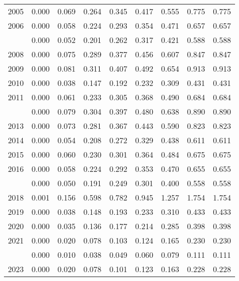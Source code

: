 \documentclass[
]{article}
\begin{document}
\begin{longtable}[t]{lrrrrrrrr}
2005 & 0.000 & 0.069 & 0.264 & 0.345 & 0.417 & 0.555 & 0.775 & 0.775\\
2006 & 0.000 & 0.058 & 0.224 & 0.293 & 0.354 & 0.471 & 0.657 & 0.657\\
\addlinespace
2007 & 0.000 & 0.052 & 0.201 & 0.262 & 0.317 & 0.421 & 0.588 & 0.588\\
2008 & 0.000 & 0.075 & 0.289 & 0.377 & 0.456 & 0.607 & 0.847 & 0.847\\
2009 & 0.000 & 0.081 & 0.311 & 0.407 & 0.492 & 0.654 & 0.913 & 0.913\\
2010 & 0.000 & 0.038 & 0.147 & 0.192 & 0.232 & 0.309 & 0.431 & 0.431\\
2011 & 0.000 & 0.061 & 0.233 & 0.305 & 0.368 & 0.490 & 0.684 & 0.684\\
\addlinespace
2012 & 0.000 & 0.079 & 0.304 & 0.397 & 0.480 & 0.638 & 0.890 & 0.890\\
2013 & 0.000 & 0.073 & 0.281 & 0.367 & 0.443 & 0.590 & 0.823 & 0.823\\
2014 & 0.000 & 0.054 & 0.208 & 0.272 & 0.329 & 0.438 & 0.611 & 0.611\\
2015 & 0.000 & 0.060 & 0.230 & 0.301 & 0.364 & 0.484 & 0.675 & 0.675\\
2016 & 0.000 & 0.058 & 0.224 & 0.292 & 0.353 & 0.470 & 0.655 & 0.655\\
\addlinespace
2017 & 0.000 & 0.050 & 0.191 & 0.249 & 0.301 & 0.400 & 0.558 & 0.558\\
2018 & 0.001 & 0.156 & 0.598 & 0.782 & 0.945 & 1.257 & 1.754 & 1.754\\
2019 & 0.000 & 0.038 & 0.148 & 0.193 & 0.233 & 0.310 & 0.433 & 0.433\\
2020 & 0.000 & 0.035 & 0.136 & 0.177 & 0.214 & 0.285 & 0.398 & 0.398\\
2021 & 0.000 & 0.020 & 0.078 & 0.103 & 0.124 & 0.165 & 0.230 & 0.230\\
\addlinespace
2022 & 0.000 & 0.010 & 0.038 & 0.049 & 0.060 & 0.079 & 0.111 & 0.111\\
2023 & 0.000 & 0.020 & 0.078 & 0.101 & 0.123 & 0.163 & 0.228 & 0.228\\*
\end{longtable}
\end{document}

